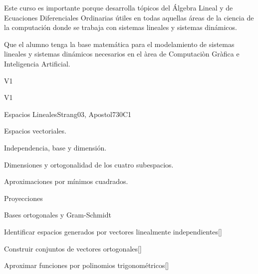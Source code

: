 \begin{syllabus}


\begin{justification}
Este curso es importante porque desarrolla tópicos del Álgebra Lineal y de Ecuaciones Diferenciales Ordinarias útiles en todas aquellas áreas de la ciencia de la computación donde se trabaja con sistemas lineales y sistemas dinámicos.
\end{justification}

\begin{goals}
\item Que el alumno tenga la base matemática para el modelamiento de sistemas lineales y sistemas dinámicos necesarios en el àrea de Computaciòn Gràfica e Inteligencia Artificial.
\end{goals}

\begin{outcomes}{V1}
  \item {}
  \item {}
  \item {}
\end{outcomes}

\begin{competences}{V1}
    \item {} 
    \item {}
    \item {}
\end{competences}

\begin{unit}{Espacios Lineales}{}{Strang03, Apostol73}{0}{C1}
\begin{topics}
      \item Espacios vectoriales.
      \item Independencia, base y dimensión.
      \item Dimensiones y ortogonalidad de los cuatro subespacios.
      \item Aproximaciones por mínimos cuadrados.
      \item Proyecciones
      \item Bases ortogonales y Gram-Schmidt
   \end{topics}
   \begin{learningoutcomes}
      \item Identificar espacios generados por vectores linealmente independientes[\Usage]
      \item Construir conjuntos de vectores ortogonales[\Usage]
      \item Aproximar funciones por polinomios trigonométricos[\Usage]
   \end{learningoutcomes}
\end{unit}


\end{syllabus}
